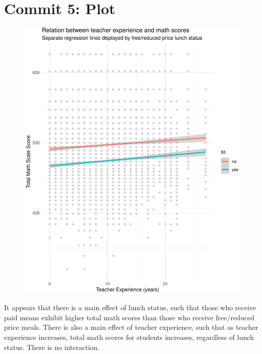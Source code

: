 \documentclass[man]{apa6}
\begin{document}
\section{Commit 5: Plot}\label{commit-5-plot}

\begin{figure}
\centering
\includegraphics{W5Lab_files/figure-latex/plot-1.pdf}
\caption{}
\end{figure}

It appears that there is a main effect of lunch status, such that those
who receive paid means exhibit higher total math scores than those who
receive free/reduced price meals. There is also a main effect of teacher
experience, such that as teacher experience increases, total math scores
for students increases, regardless of lunch status. There is no
interaction.
\end{document}
